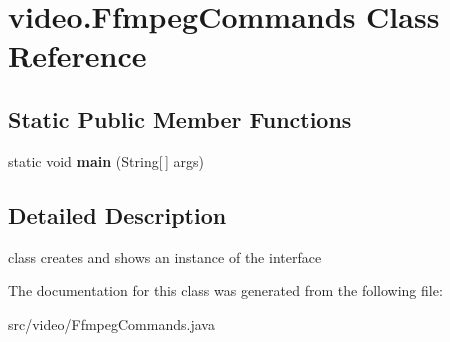 \hypertarget{classvideo_1_1_ffmpeg_commands}{
\section{video.FfmpegCommands Class Reference}
\label{classvideo_1_1_ffmpeg_commands}
}
\subsection*{Static Public Member Functions}
\begin{DoxyCompactItemize}
\item 
\hypertarget{classvideo_1_1_ffmpeg_commands_ac1646537a98df0dc44fe670598d09d04}{
static void {\bfseries main} (String\mbox{[}$\,$\mbox{]} args)}
\label{classvideo_1_1_ffmpeg_commands_ac1646537a98df0dc44fe670598d09d04}

\end{DoxyCompactItemize}


\subsection{Detailed Description}
class creates and shows an instance of the interface 

The documentation for this class was generated from the following file:\begin{DoxyCompactItemize}
\item 
src/video/FfmpegCommands.java\end{DoxyCompactItemize}
